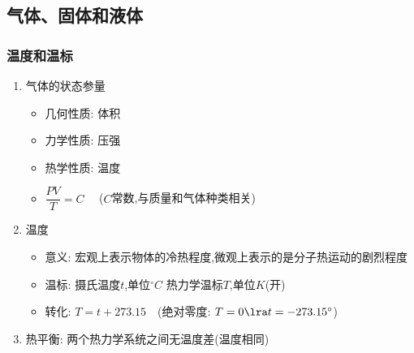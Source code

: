 \documentclass{article}
\begin{document}
\newpage

\subsection{气体、固体和液体}
\subsubsection{温度和温标}
\begin{enumerate}
    \item 气体的状态参量
          \begin{itemize}
              \item 几何性质: 体积
              \item 力学性质: 压强
              \item 热学性质: 温度
              \item $\dfrac{PV}{T} = C \quad$ ($C$常数,与质量和气体种类相关)
          \end{itemize}
    \item 温度
          \begin{itemize}
              \item 意义: 宏观上表示物体的冷热程度,微观上表示的是分子热运动的剧烈程度
              \item 温标: 摄氏温度$t$,单位$^{\circ} C$ \quad 热力学温标$T$,单位$K$(开)
              \item 转化: $T = t + 273.15 \quad$(绝对零度: $T = 0 \lra t = -273.15^{\circ} $)
          \end{itemize}
    \item 热平衡: 两个热力学系统之间无温度差(温度相同)
\end{enumerate}

\vspace{1em}
\end{document}
